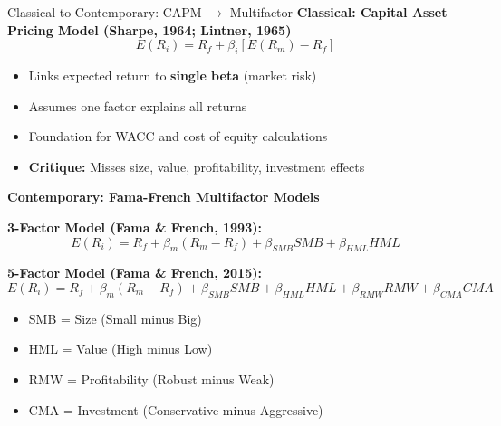 \documentclass[aspectratio=169,10pt]{beamer}
\renewcommand{\small}{\fontsize{7pt}{8.5pt}\selectfont}
\renewcommand{\large}{\fontsize{9pt}{11pt}\selectfont}
\newcommand{\question}[1]{{\large\bfseries\color{crimson}#1}}
\begin{document}
	\begin{frame}{Classical to Contemporary: CAPM $\rightarrow$ Multifactor}
		\question{Classical: Capital Asset Pricing Model (Sharpe, 1964; Lintner, 1965)}
		\small
		\[
		E(R_i) = R_f + \beta_i[E(R_m) - R_f]
		\]
		\begin{itemize}
			\item Links expected return to \textbf{single beta} (market risk)
			\item Assumes one factor explains all returns
			\item Foundation for WACC and cost of equity calculations
			\item \textbf{Critique:} Misses size, value, profitability, investment effects
		\end{itemize}
		
		\vspace{0.1cm}
		\question{Contemporary: Fama-French Multifactor Models}
		\small
		
		\textbf{3-Factor Model (Fama \& French, 1993):}
		\[
		E(R_i) = R_f + \beta_m(R_m - R_f) + \beta_{SMB}SMB + \beta_{HML}HML
		\]
		
		\textbf{5-Factor Model (Fama \& French, 2015):}
		\[
		E(R_i) = R_f + \beta_m(R_m - R_f) + \beta_{SMB}SMB + \beta_{HML}HML + \beta_{RMW}RMW + \beta_{CMA}CMA
		\]
		\begin{itemize}
			\item SMB = Size (Small minus Big)
			\item HML = Value (High minus Low)
			\item RMW = Profitability (Robust minus Weak)
			\item CMA = Investment (Conservative minus Aggressive)
		\end{itemize}
	\end{frame}
	
	
\end{document}
